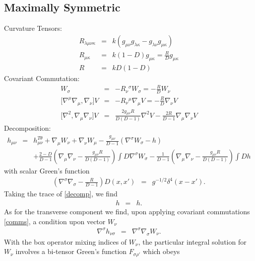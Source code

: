 \documentclass[10pt,letterpaper]{article}
\numberwithin{equation}{section}
\begin{document}
\begin{appendices}
\subsection{Maximally Symmetric}
Curvature Tensors:
\begin{eqnarray}
R_{\lambda\mu\nu\kappa} &=& k(g_{\mu\nu}g_{\lambda\kappa}-g_{\lambda\nu}g_{\mu\kappa})
\nonumber\\
R_{\mu\kappa} &=& k(1-D)g_{\mu\kappa} = \frac{R}{D}g_{\mu\kappa}
\nonumber\\
R&=& kD(1-D) 
\end{eqnarray}
Covariant Commutation:
\begin{eqnarray}
[\nabla^\sigma \nabla_\nu] W_\sigma &=& -R_{\nu}{}^\sigma W_\sigma = -\frac{R}{D}W_\nu
\nonumber\\
{[}\nabla^\mu \nabla_\mu, \nabla_\nu] V &=& -R_{\nu}{}^\mu \nabla_\mu V = -\frac{R}{D}\nabla_\nu V
\nonumber\\
{[}\nabla^2,\nabla_\mu\nabla_\nu]V &=& \frac{2 g_{\mu\nu}R}{D(D-1)}\nabla^2 V - \frac{2R}{D-1}\nabla_\mu\nabla_\nu V
\label{comms}
\end{eqnarray}
Decomposition:
\begin{eqnarray}
h_{\mu\nu} &=& h_{\mu\nu}^{T\theta} + \nabla_\mu W_\nu + \nabla_\nu W_\mu - \frac{g_{\mu\nu}}{D-1}(\nabla^\sigma W_\sigma - h)
\nonumber\\
&& +\frac{2-D}{D-1}\left( \nabla_\mu\nabla_\nu -\frac{ g_{\mu\nu}R}{D(D-1)}\right) \int D \nabla^\sigma W_\sigma
-\frac{1}{D-1}\left( \nabla_\mu\nabla_\nu -\frac{g_{\mu\nu}R}{D(D-1)}\right) \int D h
\label{decomp}
\end{eqnarray}
with scalar Green's function
\begin{eqnarray}
\left( \nabla^\sigma \nabla_\sigma  - \frac{R}{D-1}\right) D(x,x') &=& g^{-1/2} \delta^4(x-x').
\end{eqnarray}
Taking the trace of \eqref{decomp}, we find
\begin{eqnarray}
h &=& h.
\end{eqnarray}
As for the transverse component we find, upon applying covariant commutations \eqref{comms}, a condition upon vector $W_\nu$
\begin{eqnarray}
\nabla^\sigma h_{\nu\sigma}&=& \nabla^\sigma\nabla_\sigma W_\nu.
\end{eqnarray}
With the box operator mixing indices of $W_\nu$, the particular integral solution for $W_\nu$ involves a bi-tensor Green's function $F_{\sigma\rho'}$ which obeys

\end{appendices}
\end{document}
